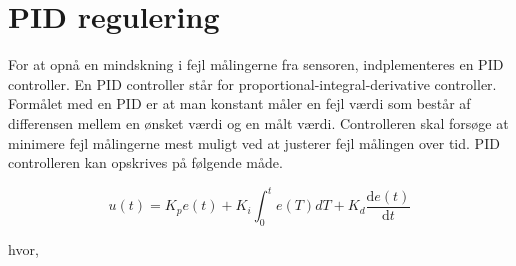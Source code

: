 \section{PID regulering}
For at opnå en mindskning i fejl målingerne fra sensoren, indplementeres en PID controller. En PID controller står for proportional-integral-derivative controller. Formålet med en PID er at man konstant måler en fejl værdi som består af differensen mellem en ønsket værdi og en målt værdi. Controlleren skal forsøge at minimere fejl målingerne mest muligt ved at justerer fejl målingen over tid.\newline
\newline
PID controlleren kan opskrives på følgende måde.

\begin{equation} 
u(t) = K_p e(t) + K_i\int_{0}^{t}e(T)dT + K_d\frac{\mathrm{d} e(t)}{\mathrm{d} t}
\end{equation}

hvor, 



